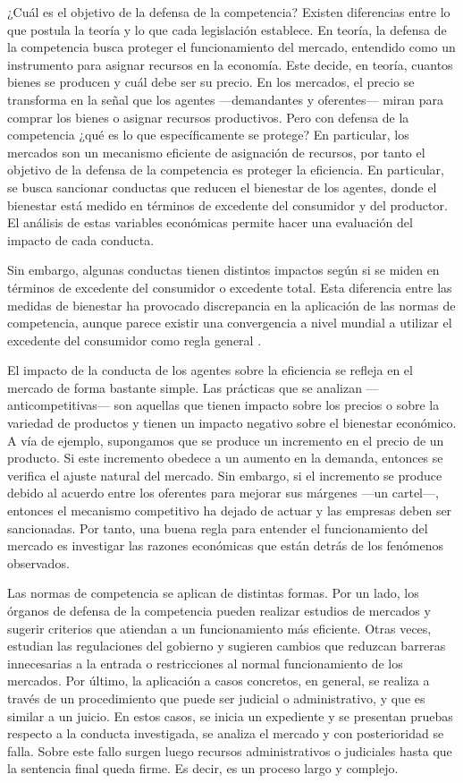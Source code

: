 \documentclass[
  12pt,
  spanish,
]{book}
\begin{document}
¿Cuál es el objetivo de la defensa de la competencia? Existen diferencias entre lo que postula la teoría y lo que cada legislación establece. En teoría, la defensa de la competencia busca proteger el funcionamiento del mercado, entendido como un instrumento para asignar recursos en la economía. Este decide, en teoría, cuantos bienes se producen y cuál debe ser su precio. En los mercados, el precio se transforma en la señal que los agentes ---demandantes y oferentes--- miran para comprar los bienes o asignar recursos productivos. Pero con defensa de la competencia ¿qué es lo que específicamente se protege? En particular, los mercados son un mecanismo eficiente de asignación de recursos, por tanto el objetivo de la defensa de la competencia es proteger la eficiencia. En particular, se busca sancionar conductas que reducen el bienestar de los agentes, donde el bienestar está medido en términos de excedente del consumidor y del productor. El análisis de estas variables económicas permite hacer una evaluación del impacto de cada conducta.

Sin embargo, algunas conductas tienen distintos impactos según si se miden en términos de excedente del consumidor o excedente total. Esta diferencia entre las medidas de bienestar ha provocado discrepancia en la aplicación de las normas de competencia, aunque parece existir una convergencia a nivel mundial a utilizar el excedente del consumidor
como regla general \citep[capítulo 2]{Motta2004}.

El impacto de la conducta de los agentes sobre la eficiencia se refleja en el mercado de forma bastante simple. Las prácticas que se analizan ---anticompetitivas--- son aquellas que tienen impacto sobre los precios o sobre la variedad de productos y tienen un impacto negativo sobre el bienestar económico. A vía de ejemplo, supongamos que se produce un incremento en el precio de un producto. Si este incremento obedece a un aumento en la demanda, entonces se verifica el ajuste natural del mercado. Sin embargo, si el incremento se produce debido al acuerdo entre los oferentes para mejorar sus márgenes ---un cartel---, entonces el mecanismo competitivo ha dejado de actuar y las empresas deben ser sancionadas. Por tanto, una buena regla para entender el funcionamiento del mercado es investigar las razones económicas que están detrás de los fenómenos observados.

Las normas de competencia se aplican de distintas formas. Por un lado, los órganos de defensa de la competencia pueden realizar estudios de mercados y sugerir criterios que atiendan a un funcionamiento más eficiente. Otras veces, estudian las regulaciones del gobierno y sugieren cambios que reduzcan barreras innecesarias a la entrada o restricciones al normal funcionamiento de los mercados. Por último, la aplicación a casos concretos, en general, se realiza a través de un procedimiento que puede ser judicial o administrativo, y que es similar a un juicio. En estos casos, se inicia un expediente y se presentan pruebas respecto a la conducta investigada, se analiza el mercado y con posterioridad se falla. Sobre este fallo surgen luego recursos administrativos o judiciales hasta que la sentencia final queda firme. Es decir, es un proceso largo y complejo.
\end{document}
